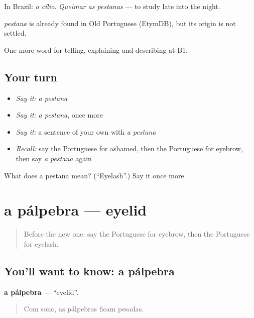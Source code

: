 In Brazil: \emph{o cílio}. \emph{Queimar as pestanas} — to study late into the night.

\begin{cousinweb}
\emph{pestana} is already found in Old Portuguese (EtymDB), but its origin is not settled.
\end{cousinweb}

\begin{grammarlens}[title={What you've built}]
One more word for telling, explaining and describing at B1.
\end{grammarlens}

\subsection*{Your turn}
\begin{itemize}
\raggedright
  \item \emph{Say it:} \emph{a pestana}
  \item \emph{Say it:} \emph{a pestana}, once more
  \item \emph{Say it:} a sentence of your own with \emph{a pestana}
  \item \emph{Recall:} say the Portuguese for ashamed, then the Portuguese for eyebrow, then say \emph{a pestana} again
\end{itemize}

\begin{tcolorbox}[breakable,colback=teal!4,colframe=teal!35!black,title={Before you move on}]
What does a pestana mean? (\textquotedblleft{}Eyelash\textquotedblright{}.) Say it once more.
\end{tcolorbox}
\section[a pálpebra]{a pálpebra — eyelid}

\label{lesson:PT-C481-palpebra}



\begin{quote}
Before the new one: say the Portuguese for eyebrow, then the Portuguese for eyelash.
\end{quote}

\subsection*{You'll want to know: a pálpebra}
\textbf{a pálpebra} — \textquotedblleft{}eyelid\textquotedblright{}.

\begin{quote}
Com sono, as pálpebras ficam pesadas.
\end{quote}

